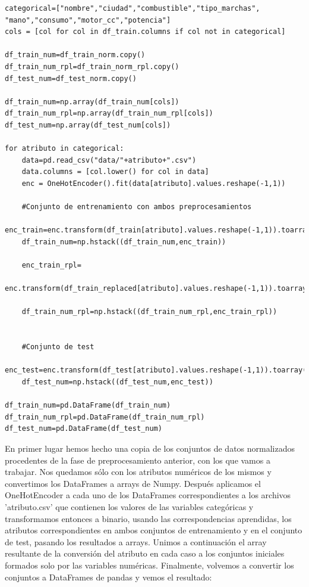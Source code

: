 \documentclass[a4paper,11pt]{article}
\begin{document}
\begin{verbatim}
categorical=["nombre","ciudad","combustible","tipo_marchas",
"mano","consumo","motor_cc","potencia"]
cols = [col for col in df_train.columns if col not in categorical]    

df_train_num=df_train_norm.copy()
df_train_num_rpl=df_train_norm_rpl.copy()
df_test_num=df_test_norm.copy()

df_train_num=np.array(df_train_num[cols])
df_train_num_rpl=np.array(df_train_num_rpl[cols])
df_test_num=np.array(df_test_num[cols])

for atributo in categorical:
	data=pd.read_csv("data/"+atributo+".csv")
	data.columns = [col.lower() for col in data]
	enc = OneHotEncoder().fit(data[atributo].values.reshape(-1,1))
	
	#Conjunto de entrenamiento con ambos preprocesamientos
	enc_train=enc.transform(df_train[atributo].values.reshape(-1,1)).toarray()        
	df_train_num=np.hstack((df_train_num,enc_train))
	
	enc_train_rpl=
	enc.transform(df_train_replaced[atributo].values.reshape(-1,1)).toarray()
	
	df_train_num_rpl=np.hstack((df_train_num_rpl,enc_train_rpl))
	
	
	#Conjunto de test
	enc_test=enc.transform(df_test[atributo].values.reshape(-1,1)).toarray()
	df_test_num=np.hstack((df_test_num,enc_test))

df_train_num=pd.DataFrame(df_train_num)
df_train_num_rpl=pd.DataFrame(df_train_num_rpl)
df_test_num=pd.DataFrame(df_test_num)
\end{verbatim}

En primer lugar hemos hecho una copia de los conjuntos de datos normalizados procedentes de la fase de preprocesamiento anterior, con los que vamos a trabajar. Nos quedamos sólo con los atributos numéricos de los mismos y convertimos los DataFrames a arrays de Numpy. Después aplicamos el OneHotEncoder a cada uno de los DataFrames correspondientes a los archivos 'atributo.csv' que contienen los valores de las variables categóricas y transformamos entonces a binario, usando las correspondencias aprendidas, los atributos correspondientes en ambos conjuntos de entrenamiento y en el conjunto de test, pasando los resultados a arrays. Unimos a continuación el array resultante de la conversión del atributo en cada caso a los conjuntos iniciales formados solo por las variables numéricas. Finalmente, volvemos a convertir los conjuntos a DataFrames de pandas y vemos el resultado:
\end{document}
